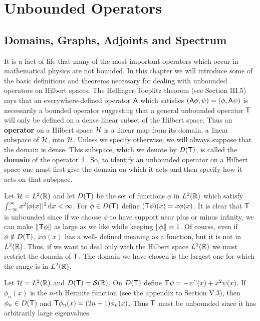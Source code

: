 \setcounter{section}{9}
\section{Unbounded Operators}

\subsection{Domains, Graphs, Adjoints and Spectrum}

It is a fact of life that many of the most important operators which occur in mathematical physics are not bounded. In this chapter we will introduce some of the basic definitions and theorems necessary for dealing with unbounded operators on Hilbert spaces. The Hellinger-Toeplitz theorem (see Section III.5) says that an everywhere-defined operator $\mathsf{A}$ which satisfies $(\mathsf{A} \phi, \psi) = (\phi, \mathsf{A} \psi) $ is necessarily a bounded operator suggesting that a general unbounded operator $\mathsf{T}$ will only be defined on a dense linear subset of the Hilbert space.
Thus an \textbf{operator} on a Hilbert space $\mathcal{H}$ is a linear map from its domain, a linear subspace of $\mathcal{H}$, into $\mathcal{H}$. Unless we specify otherwise, we will always suppose that the domain is dense. This subspace, which we denote by $D( \mathsf{T})$, is called the \textbf{domain} of the operator $\mathsf{T}$. So, to identify an unbounded operator on a Hilbert space one must first give the domain on which it acts and then specify how it acts on that subspace.

\begin{example}
Let $\mathcal{H} = L^{2}(\mathbb{R})$ and let $D(\mathsf{T})$ be the set of functions $\phi$ in $L^{2}(\mathbb{R})$ which satisfy $\int_{-\infty}^{\infty} x^2 |\phi(x)|^2 \, \mathrm{d} x < \infty$. For $\phi \in D(\mathsf{T})$ define $(\mathsf{T} \phi)(x) = x \phi(x)$. It is clear that $\mathsf{T}$ is unbounded since if we choose $\phi$ to have support near plus or minus infinity, we can make $\left \Vert \mathsf{T} \phi \right \Vert$ as large as we like while keeping $\left \Vert \phi \right \Vert =1$. Of course, even if $\phi \notin D(\mathsf{T})$, $x \phi(x)$ has a well- defined meaning as a function, but it is not in $L^{2}(\mathbb{R})$. Thus, if we want to deal only with the Hilbert space $L^{2}(\mathbb{R})$ we must restrict the domain of $\mathsf{T}$. The domain we have chosen is the largest one for which the range is in $L^{2}(\mathbb{R})$.
\end{example}

\begin{example}
Let $\mathcal{H} = L^{2}(\mathbb{R})$ and $D(\mathsf{T})= \mathcal{S}(\mathbb{R})$. On $D(\mathsf{T})$ define $\mathsf{T} \psi = - \psi"(x) + x^2 \psi(x)$. If $\phi_n(x)$ is the $n$-th Hermite function (see the appendix to Section V.3), then $\phi_n \in D(\mathsf{T})$ and $\mathsf{T}\phi_n(x) = (2n+1) \phi_n(x)$. Thus $\mathsf{T}$ must be unbounded since it has arbitrarily large eigenvalues.
\end{example}

